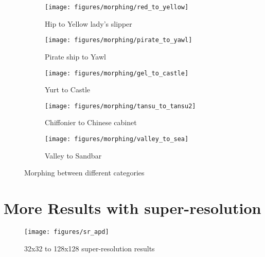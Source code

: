 \documentclass{article}
\begin{document}
\begin{figure}[htp]
	\centering
	\begin{subfigure}{0.8\textwidth}
	    \texttt{[image: figures/morphing/red\_to\_yellow]}
	    \caption{Hip to Yellow lady's slipper} 
    \end{subfigure}
    \begin{subfigure}{0.8\textwidth}
	    \texttt{[image: figures/morphing/pirate\_to\_yawl]}
	    \caption{Pirate ship to Yawl} 
    \end{subfigure}
    \begin{subfigure}{0.8\textwidth}
	    \texttt{[image: figures/morphing/gel\_to\_castle]}
	    \caption{Yurt to Castle} 
    \end{subfigure}
    \begin{subfigure}{0.8\textwidth}
	    \texttt{[image: figures/morphing/tansu\_to\_tansu2]}
	    \caption{Chiffonier to Chinese cabinet}
    \end{subfigure}
	\begin{subfigure}{0.8\textwidth}
	    \texttt{[image: figures/morphing/valley\_to\_sea]}
	    \caption{Valley to Sandbar} 
    \end{subfigure}
    \caption{Morphing between different categories}
\end{figure}

\clearpage
\section{More Results with super-resolution}
\begin{figure}[htp]
	\centering
	\texttt{[image: figures/sr\_apd]}
	\caption{\label{subfig:genbutt_sr} 32x32 to 128x128 super-resolution results} 
\end{figure}
\end{document}

